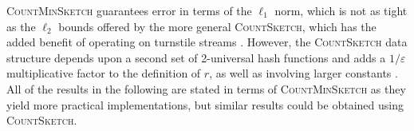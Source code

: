 \documentclass{report}
\newtheorem{theorem}{Theorem}[section]
\newcommand{\algoname}[1]{\textnormal{\textsc{#1}}}
\newcommand{\med}{\mathrm{median}}
\begin{document}
\algoname{CountMinSketch} guarantees error in terms of the $\ell_1$ norm, which is not as tight as the $\ell_2$ bounds offered by the more general \algoname{CountSketch}, which has the added benefit of operating on turnstile streams \cite{charikar2002finding}. 
However, the \algoname{CountSketch} data structure depends upon a second set of 2-universal hash functions and adds a $1/\varepsilon$ multiplicative factor to the definition of $r$, as well as involving larger constants \cite{cormode2005improved}.
All of the results in the following are stated in terms of \algoname{CountMinSketch} as they yield more practical implementations, but similar results could be obtained using \algoname{CountSketch}.



%
%
%
%
%
\end{document}
